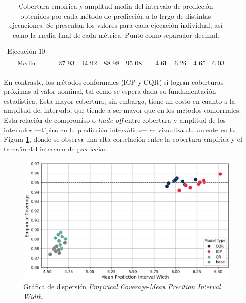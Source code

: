 \begin{table}[h]
\begin{tabular}{cc@{\hskip 3pt}ccccc@{\hskip 3pt}cccc}
    Ejecución 10                     &  &               &              &             &              &  &               &              &             &              \\ \cline{1-1} \cline{3-6} \cline{8-11} 
    Media                            &  & 87.93         & 94.92        & 88.98       & 95.08        &  & 4.61          & 6.26         & 4.65        & 6.03         \\ 
    \bottomrule
    \end{tabular}
    \caption[
        Cobertura empírica y amplitud media del intervalo de predicción obtenidos por cada método de predicción a lo largo de distintas ejecuciones.
    ]{   
        Cobertura empírica y amplitud media del intervalo de predicción obtenidos por cada método de predicción a lo largo de distintas ejecuciones. 
        Se presentan los valores para cada ejecución individual, así como la media final de cada métrica. Punto como separador decimal.
    }
    \label{tab:AE_EC_MPIW_comparative}
\end{table}

En contraste, los métodos conformales (ICP y CQR) sí logran coberturas próximas al valor nominal, tal como se espera dada su fundamentación estadística. Esta mayor cobertura, sin embargo, tiene un costo en cuanto a la amplitud del intervalo, que tiende a ser mayor que en los métodos conformales. Esta relación de compromiso o \textit{trade-off} entre cobertura y amplitud de los intervalos ---típico en la predicción interválica--- se visualiza claramente en la Figura \ref{fig:AE_scatterplot_EC-MPIW}, donde se observa una alta correlación entre la cobertura empírica y el tamaño del intervalo de predicción.

\begin{figure}[h]
    \centering
    \includegraphics[width=\textwidth]{capitulos/cap_05/imagenes/AE_scatterplot_EC-MPIW.png}
    \caption[
        Gráfica de dispersión \textit{Empirical Coverage}-\textit{Mean Precition Interval Width}
    ]{
        Gráfica de dispersión \textit{Empirical Coverage}-\textit{Mean Precition Interval Width}. 
    }
    \label{fig:AE_scatterplot_EC-MPIW}
\end{figure}

